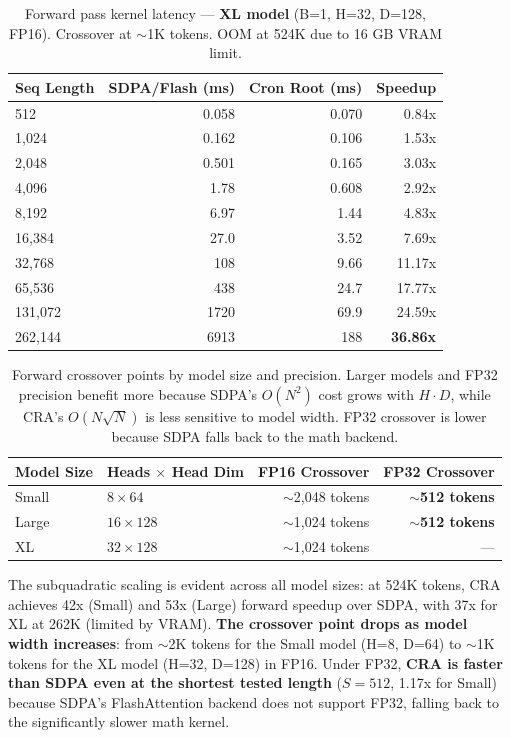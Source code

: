 \documentclass{article}
\begin{document}
    \begin{table}[h]
    \centering
    \caption{Forward pass kernel latency --- \textbf{XL model} (B=1, H=32, D=128, FP16). Crossover at $\sim$1K tokens. OOM at 524K due to 16 GB VRAM limit.}
    \begin{tabular}{lrrr}
    \toprule
    Seq Length & SDPA/Flash (ms) & Cron Root (ms) & Speedup \\
    \midrule
    512 & 0.058 & 0.070 & 0.84x \\
    1,024 & 0.162 & 0.106 & 1.53x \\
    2,048 & 0.501 & 0.165 & 3.03x \\
    4,096 & 1.78 & 0.608 & 2.92x \\
    8,192 & 6.97 & 1.44 & 4.83x \\
    16,384 & 27.0 & 3.52 & 7.69x \\
    32,768 & 108 & 9.66 & 11.17x \\
    65,536 & 438 & 24.7 & 17.77x \\
    131,072 & 1720 & 69.9 & 24.59x \\
    262,144 & 6913 & 188 & \textbf{36.86x} \\
    \bottomrule
    \end{tabular}
    \label{tab:kernel_xl}
    \end{table}

    \begin{table}[h]
    \centering
    \caption{Forward crossover points by model size and precision. Larger models and FP32 precision benefit more because SDPA's $O(N^2)$ cost grows with $H \cdot D$, while CRA's $O(N\sqrt{N})$ is less sensitive to model width. FP32 crossover is lower because SDPA falls back to the math backend.}
    \begin{tabular}{llrr}
    \toprule
    Model Size & Heads $\times$ Head Dim & FP16 Crossover & FP32 Crossover \\
    \midrule
    Small & $8 \times 64$ & $\sim$2,048 tokens & $\sim$\textbf{512 tokens} \\
    Large & $16 \times 128$ & $\sim$1,024 tokens & $\sim$\textbf{512 tokens} \\
    XL & $32 \times 128$ & $\sim$1,024 tokens & --- \\
    \bottomrule
    \end{tabular}
    \label{tab:crossover}
    \end{table}

    The subquadratic scaling is evident across all model sizes: at 524K tokens, CRA achieves 42x (Small) and 53x (Large) forward speedup over SDPA, with 37x for XL at 262K (limited by VRAM). \textbf{The crossover point drops as model width increases}: from $\sim$2K tokens for the Small model (H=8, D=64) to $\sim$1K tokens for the XL model (H=32, D=128) in FP16. Under FP32, \textbf{CRA is faster than SDPA even at the shortest tested length} ($S=512$, 1.17x for Small) because SDPA's FlashAttention backend does not support FP32, falling back to the significantly slower math kernel.
\end{document}
